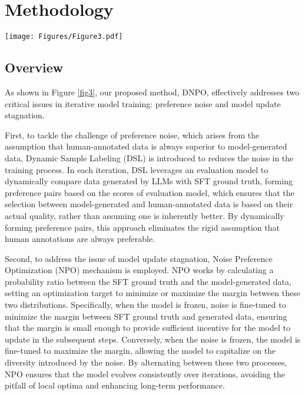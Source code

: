 \section{Methodology}\label{sec:model}
\begin{figure*}[t]
    \centering
    \texttt{[image: Figures/Figure3.pdf]}
    \caption{This diagram illustrates the iterative training process of DNPO. There are two core components: Dynamic Sample Labeling (DSL) and Noise Preference Optimization (NPO). In each iteration $k$, DSL is responsible for generating new data from the model and labeling it by comparing it with SFT ground truth data using an evaluation model, forming preference pairs. These pairs are then passed to the NPO, which computes a probability ratio between the SFT ground truth and the generated data. NPO applies a noise-tuning strategy, where the model is frozen and the noise component is trained to minimize the margin between positive and negative sample pairs. In the following step, the noise is frozen while optimizing the model to maximize this margin. This leads to an updated model for the next iteration $k+1$.}
    \label{fig3}
\end{figure*}

\subsection{Overview}
As shown in Figure \ref{fig3}, our proposed method, DNPO, effectively addresses two critical issues in iterative model training: preference noise and model update stagnation.

First, to tackle the challenge of preference noise, which arises from the assumption that human-annotated data is always superior to model-generated data, Dynamic Sample Labeling (DSL) is introduced to reduces the noise in the training process. In each iteration, DSL leverages an evaluation model to dynamically compare data generated by LLMs with SFT ground truth, forming preference pairs based on the scores of evaluation model, which ensures that the selection between model-generated and human-annotated data is based on their actual quality, rather than assuming one is inherently better. By dynamically forming preference pairs, this approach eliminates the rigid assumption that human annotations are always preferable. 

Second, to address the issue of model update stagnation, Noise Preference Optimization (NPO) mechanism is employed. NPO works by calculating a probability ratio between the SFT ground truth and the model-generated data, setting an optimization target to minimize or maximize the margin between these two distributions. Specifically, when the model is frozen, noise is fine-tuned to minimize the margin between SFT ground truth and generated data, ensuring that the margin is small enough to provide sufficient incentive for the model to update in the subsequent steps. Conversely, when the noise is frozen, the model is fine-tuned to maximize the margin, allowing the model to capitalize on the diversity introduced by the noise.
By alternating between these two processes, NPO ensures that the model evolves consistently over iterations, avoiding the pitfall of local optima and enhancing long-term performance.


